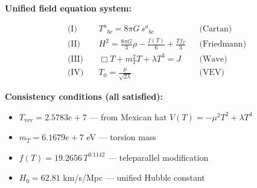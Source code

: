 
\textbf{Unified field equation system:}

\begin{align}
  \text{(I)} \quad & T^a{}_{bc} = 8\pi G \, s^a{}_{bc} && \text{(Cartan)} \\
  \text{(II)} \quad & H^2 = \frac{8\pi G}{3}\rho - \frac{f(T)}{6} + \frac{Tf_T}{3} && \text{(Friedmann)} \\
  \text{(III)} \quad & \Box T + m_T^2 T + \lambda T^3 = J && \text{(Wave)} \\
  \text{(IV)} \quad & T_0 = \frac{\mu}{\sqrt{2\lambda}} && \text{(VEV)}
\end{align}

\textbf{Consistency conditions (all satisfied):}
\begin{itemize}
  \item $T_{\text{vev}} = 2.5783e+7$ — from Mexican hat $V(T) = -\mu^2 T^2 + \lambda T^4$
  \item $m_T = 6.1679e+7$ eV — torsion mass
  \item $f(T) = 19.2656 \, T^{0.1142}$ — teleparallel modification
  \item $H_0 = 62.81$ km/s/Mpc — unified Hubble constant
\end{itemize}